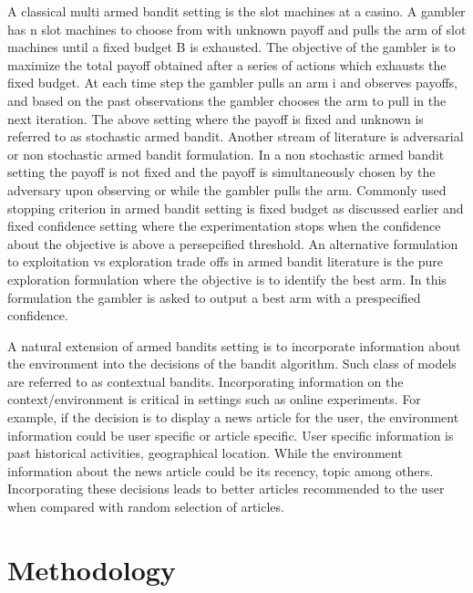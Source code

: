 \documentclass[letterpaper,11pt]{article}
\begin{document}
A classical multi armed bandit setting is the slot machines at a casino. A gambler has n slot machines to choose from with unknown payoff and pulls the arm of slot machines until a fixed budget B is exhausted. The objective of the gambler is to maximize the total payoff obtained after a series of actions which exhausts the fixed budget. At each time step the gambler pulls an arm i and observes payoffs, and based on the past observations the gambler chooses the arm to pull in the next iteration. The above setting where the payoff is fixed and unknown is referred to as stochastic armed bandit. Another stream of literature is adversarial or non stochastic armed bandit formulation. In a non stochastic armed bandit setting the payoff is not fixed and the payoff is simultaneously chosen by the adversary upon observing or while the gambler pulls the arm. Commonly used stopping criterion in armed bandit setting is fixed budget as discussed earlier and fixed confidence setting where the experimentation stops when the confidence about the objective is above a persepcified threshold. An alternative formulation to exploitation vs exploration trade offs in armed bandit literature is the pure exploration formulation where the objective is to identify the best arm. In this formulation the gambler is asked to output a best arm with a prespecified confidence. 

A natural extension of armed bandits setting is to incorporate information about the environment into the decisions of the bandit algorithm. Such class of models are referred to as contextual bandits. Incorporating information on the context/environment is critical in settings such as online experiments. For example, if the decision is to display a news article for the user, the environment information could be user specific or article specific. User specific information is past historical activities, geographical location. While the environment information about the news article could be its recency, topic among others. Incorporating these decisions leads to better articles recommended to the user when compared with random selection of articles.


\section{Methodology}
\end{document}
